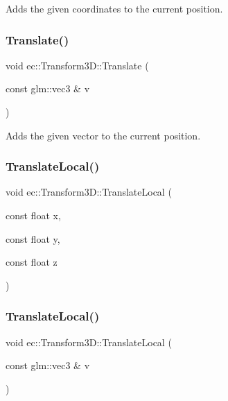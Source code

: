 Adds the given coordinates to the current position. \mbox{\label{classec_1_1_transform3_d_a9935de1ebeecdd4bfd58073c1ea1b854}} 
\subsubsection{\texorpdfstring{Translate()}{Translate()}\hspace{0.1cm}{\footnotesize\ttfamily [2/2]}}
{\footnotesize\ttfamily void ec\+::\+Transform3\+D\+::\+Translate (\begin{DoxyParamCaption}\item[{const glm\+::vec3 \&}]{v }\end{DoxyParamCaption})}

Adds the given vector to the current position. \mbox{\label{classec_1_1_transform3_d_a84df51411133b3402b75fa05bd51faae}} 
\subsubsection{\texorpdfstring{Translate\+Local()}{TranslateLocal()}\hspace{0.1cm}{\footnotesize\ttfamily [1/2]}}
{\footnotesize\ttfamily void ec\+::\+Transform3\+D\+::\+Translate\+Local (\begin{DoxyParamCaption}\item[{const float}]{x,  }\item[{const float}]{y,  }\item[{const float}]{z }\end{DoxyParamCaption})}

\mbox{\label{classec_1_1_transform3_d_a44ece37c7f56329840c2f92ae695e9a2}} 
\subsubsection{\texorpdfstring{Translate\+Local()}{TranslateLocal()}\hspace{0.1cm}{\footnotesize\ttfamily [2/2]}}
{\footnotesize\ttfamily void ec\+::\+Transform3\+D\+::\+Translate\+Local (\begin{DoxyParamCaption}\item[{const glm\+::vec3 \&}]{v }\end{DoxyParamCaption})}


